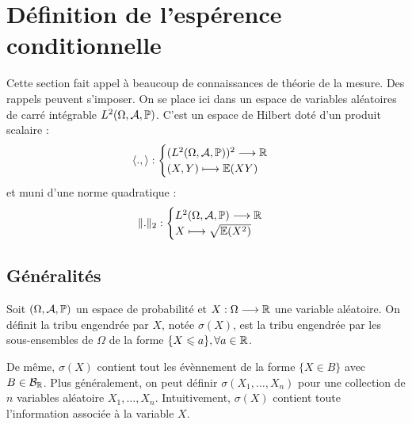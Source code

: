 
\section{Définition de l'espérence conditionnelle}

Cette section fait appel à beaucoup de connaissances de théorie de la mesure. 
Des rappels peuvent s'imposer. On se place ici dans un espace de variables aléatoires 
de carré intégrable $L^2( \Omega, \mathcal{A}, \mathbb{P} )$. C'est un espace de Hilbert 
doté d'un produit scalaire : 
    $$ 
        \langle ., \rangle : 
            \begin{cases}
                (L^2( \Omega, \mathcal{A}, \mathbb{P} ))^2 \longrightarrow \mathbb{R} \\ 
                (X,Y) \longmapsto \mathbb{E}(XY) 
            \end{cases}
    $$ 
et muni d'une norme quadratique : 
    $$ 
        \| .\|_2 : 
            \begin{cases}
                L^2( \Omega, \mathcal{A}, \mathbb{P} ) \longrightarrow \mathbb{R} \\ 
                X \longmapsto \sqrt{ \mathbb{E}(X^2)}
            \end{cases}
    $$

\subsection{Généralités}

\begin{definition}
    Soit $( \Omega, \mathcal{A}, \mathbb{P})$ un espace de probabilité et $X : \Omega \longrightarrow \mathbb{R}$ une variable 
    aléatoire. On définit la tribu engendrée par $X$, notée $ \sigma(X)$, est la tribu engendrée par les sous-ensembles 
    de $ \Omega$ de la forme $ \{X \leqslant a\}, \forall a \in \mathbb{R}$. 

    \medskip 

    De même, $ \sigma(X)$ contient tout les évènnement de la forme $\{X \in B\}$ avec $B \in \mathcal{B}_{\mathbb{R}}$. Plus généralement, 
    on peut définir $ \sigma(X_1, \dots, X_n)$ pour une collection de $n$ variables aléatoire $X_1, \dots, X_n$.  
    Intuitivement, $ \sigma(X)$ contient toute l'information associée à la variable $X$. 
\end{definition}

